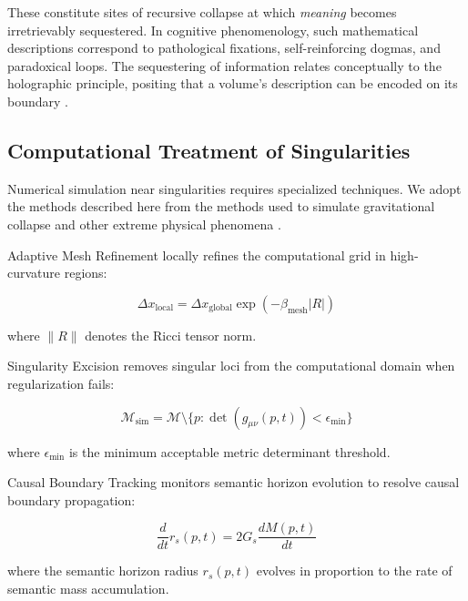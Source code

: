 These constitute sites of recursive collapse at which \textit{meaning} becomes irretrievably sequestered. In cognitive phenomenology, such mathematical descriptions correspond to pathological fixations, self-reinforcing dogmas, and paradoxical loops. The sequestering of information relates conceptually to the holographic principle, positing that a volume's description can be encoded on its boundary \autocite{tHooft1993, Susskind1995, Maldacena1998}.


\subsection{Computational Treatment of Singularities}
\label{12.2.3:computational_treatment_of_singularities}

Numerical simulation near singularities requires specialized techniques. We adopt the methods described here from the methods used to simulate gravitational collapse and other extreme physical phenomena \autocite{BaumgarteShapiro2010}.

Adaptive Mesh Refinement locally refines the computational grid in high-curvature regions:

\begin{equation}
\Delta x_{\text{local}} = \Delta x_{\text{global}} \exp(-\beta_{\text{mesh}} |R|)
\end{equation}

where \(\|R\|\) denotes the Ricci tensor norm.

Singularity Excision removes singular loci from the computational domain when regularization fails:

\begin{equation}
\mathcal{M}_{\text{sim}} = \mathcal{M} \setminus \{p : \det(g_{\mu\nu}(p, t)) < \epsilon_{\text{min}}\}
\end{equation}

where \(\epsilon_{\text{min}}\) is the minimum acceptable metric determinant threshold.

Causal Boundary Tracking monitors semantic horizon evolution to resolve causal boundary propagation:

\begin{equation}
\frac{d}{dt} r_s(p, t) = 2G_s \frac{dM(p, t)}{dt}
\end{equation}

where the semantic horizon radius \(r_s(p, t)\) evolves in proportion to the rate of semantic mass accumulation.

